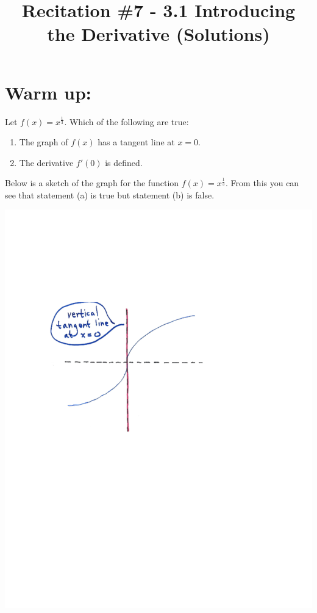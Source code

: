 \documentclass[nooutcomes]{ximera}
\title{Recitation \#7 - 3.1 Introducing the Derivative (Solutions)}
\begin{document}
\begin{abstract}		\end{abstract}
\maketitle

\section*{Warm up:} 
Let $f(x) = x^{\frac{1}{3}}$.  Which of the following are true:
	
	\begin{enumerate}
	
	\item The graph of $f(x)$ has a tangent line at $x=0$.
	
	\item The derivative $f'(0)$ is defined.
	
	\end{enumerate}

		\begin{freeResponse}
		Below is a sketch of the graph for the function $f(x) = x^{\frac{1}{3}}$.  From this you can see that statement (a) is true but statement (b) is false.
			\begin{image}
			\includegraphics[trim= 170 350 250 180]{Figure1.pdf}
			\end{image}
		\end{freeResponse}
	
\end{document}
